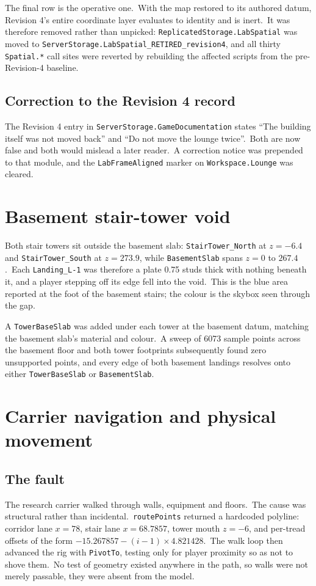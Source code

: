 The final row is the operative one.\ With the map restored to its authored
datum, Revision 4's entire coordinate layer evaluates to identity and is inert.\
It was therefore removed rather than unpicked:
\texttt{ReplicatedStorage.LabSpatial} was moved to
\texttt{ServerStorage.LabSpatial\_RETIRED\_revision4}, and all thirty
\texttt{Spatial.*} call sites were reverted by rebuilding the affected scripts
from the pre-Revision-4 baseline.\

\subsection{Correction to the Revision 4 record}
The Revision 4 entry in \texttt{ServerStorage.GameDocumentation} states ``The
building itself was not moved back'' and ``Do not move the lounge twice''.\ Both
are now false and both would mislead a later reader.\ A correction notice was
prepended to that module, and the \texttt{LabFrameAligned} marker on
\texttt{Workspace.Lounge} was cleared.\

\section{Basement stair-tower void}
Both stair towers sit outside the basement slab: \texttt{StairTower\_North} at
$z=-6.4$ and \texttt{StairTower\_South} at $z=273.9$, while
\texttt{BasementSlab} spans $z=0$ to $267.4$.\ Each \texttt{Landing\_L-1} was
therefore a plate 0.75 studs thick with nothing beneath it, and a player
stepping off its edge fell into the void.\ This is the blue area reported at the
foot of the basement stairs; the colour is the skybox seen through the gap.\

A \texttt{TowerBaseSlab} was added under each tower at the basement datum,
matching the basement slab's material and colour.\ A sweep of 6073 sample
points across the basement floor and both tower footprints subsequently found
zero unsupported points, and every edge of both basement landings resolves onto
either \texttt{TowerBaseSlab} or \texttt{BasementSlab}.\

\section{Carrier navigation and physical movement}

\subsection{The fault}
The research carrier walked through walls, equipment and floors.\ The cause was
structural rather than incidental.\ \texttt{routePoints} returned a hardcoded
polyline: corridor lane $x=78$, stair lane $x=68.7857$, tower mouth $z=-6$, and
per-tread offsets of the form $-15.267857-(i-1)\times 4.821428$.\ The walk loop
then advanced the rig with \texttt{PivotTo}, testing only for player proximity
so as not to shove them.\ No test of geometry existed anywhere in the path, so
walls were not merely passable, they were absent from the model.\

